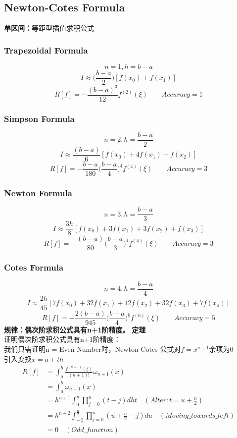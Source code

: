 \documentclass[12pt]{article}
\begin{document}
\begin{CJK*}{UTF8}{gbsn}
\begin{spacing}{1.5}
\subsection{Newton-Cotes Formula}
\textbf{单区间：}等距型插值求积公式
\subsubsection{Trapezoidal Formula}
    $$n = 1,h = b-a$$
    $$I \approx \big(\frac{b-a}{2}\big)[f(x_0)+f(x_1)]$$
    $$R[f] = -\frac{(b-a)^3}{12}f^{(2)}(\xi) \qquad Accuracy = 1$$
\subsubsection{Simpson Formula}
    $$n = 2,h = \frac{b-a}{2}$$
    $$I \approx \frac{(b-a)}{6}[f(x_0) + 4f(x_1)+f(x_2)]$$
    $$R[f] = -\frac{b-a}{180}\big(\frac{b-a}{4}\big)^4f^{(4)}(\xi) \qquad Accuracy = 3$$
\subsubsection{Newton Formula}
    $$n = 3,h = \frac{b-a}{3}$$
    $$I \approx \frac{3h}{8}[f(x_0)+3f(x_1)+3f(x_2)+f(x_3)]$$
    $$R[f] = -\frac{(b-a)}{80}\big(\frac{b-a}{3}\big)^4f^{(4)}(\xi) \qquad Accuracy = 3$$
\subsubsection{Cotes Formula}
    $$n = 4,h = \frac{b-a}{4}$$
    $$I \approx \frac{2h}{45}[7f(x_0)+32f(x_1)+12f(x_2)+32f(x_3) +7f(x_4)]$$
    $$R[f] = -\frac{2(b-a)}{945}\big(\frac{b-a}{4}\big)^6f^{(6)}(\xi) \qquad Accuracy = 5$$
\textbf{规律：偶次阶求积公式具有n+1阶精度。}
\newpage
\textbf{定理}\\
    证明偶次阶求积公式具有n+1阶精度：\\
    我们只需证明n = Even Number时，Newton-Cotes 公式对$f = x^{n+1}$余项为0\\
    引入变换$x = a + th$
    $$
    \begin{aligned}
        R[f] &= \int_a^b\frac{f^{(n+1)}(\xi)}{(n+1)!}\omega_{n+1}(x)\\
             &= \int_a^b \omega_{n+1}(x)\\
             &= h^{n+1}\int_0^n \prod_{j=0}^n(t-j)dht\quad(Alter: t=u+\frac{n}{2})\\  
             &= h^{n+2}\int_{-\frac{n}{2}}^{\frac{n}{2}}\prod_{j=0}^n(u+\frac{n}{2}-j)du \quad (Moving\_towards\_left)\\
             &= 0 \quad (Odd\_function)
    \end{aligned}
    $$
    

\end{spacing}
\end{CJK*}
\end{document}
